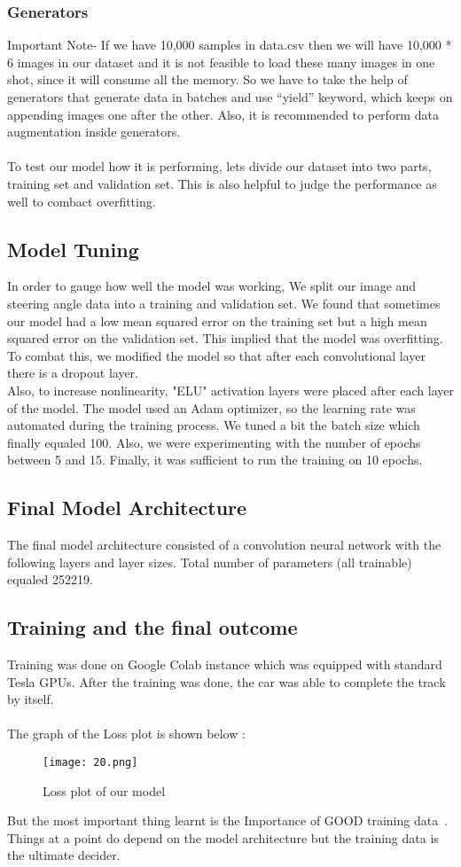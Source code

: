 \subsubsection{Generators}
Important Note- If we have 10,000 samples in data.csv then we will have 10,000 * 6 images in our dataset and it is not feasible to load these many images in one shot, since it will consume all the memory. So we have to take the help of generators that generate data in batches and use “yield” keyword, which keeps on appending images one after the other. Also, it is recommended to perform data augmentation inside generators.\\\\
To test our model how it is performing, lets divide our dataset into two parts, training set and validation set. This is also helpful to judge the performance as well to combact overfitting.

\subsection{Model Tuning}
In order to gauge how well the model was working, We split our image and steering angle data into a training and validation set. We found that sometimes our model had a low mean squared error on the training set but a high mean squared error on the validation set. This implied that the model was overfitting. To combat this, we modified the model so that after each convolutional layer there is a dropout layer.\\ Also, to increase nonlinearity, "ELU" activation layers were placed after each layer of the model. The model used an Adam optimizer, so the learning rate was automated during the training process. We tuned a bit the batch size which finally equaled 100. Also, we were experimenting with the number of epochs between 5 and 15. Finally, it was sufficient to run the training on 10 epochs.

\subsection{Final Model Architecture}
The final model architecture consisted of a convolution neural network with the following layers and layer sizes. Total number of parameters (all trainable) equaled 252219.

\subsection{Training and the final outcome}
Training was done on Google Colab instance which was equipped with standard Tesla GPUs. After the training was done, the car was able to complete the track by itself.\\ \\
The graph of the Loss plot is shown below :\\
 \begin{figure}[H]
	\centering
	\texttt{[image: 20.png]}
	\caption{Loss plot of our model}
\end{figure}
But the most important thing learnt is the Importance of GOOD training data~\cite{lu2017much}. Things at a point do depend on the model architecture but the training data is the ultimate decider.


